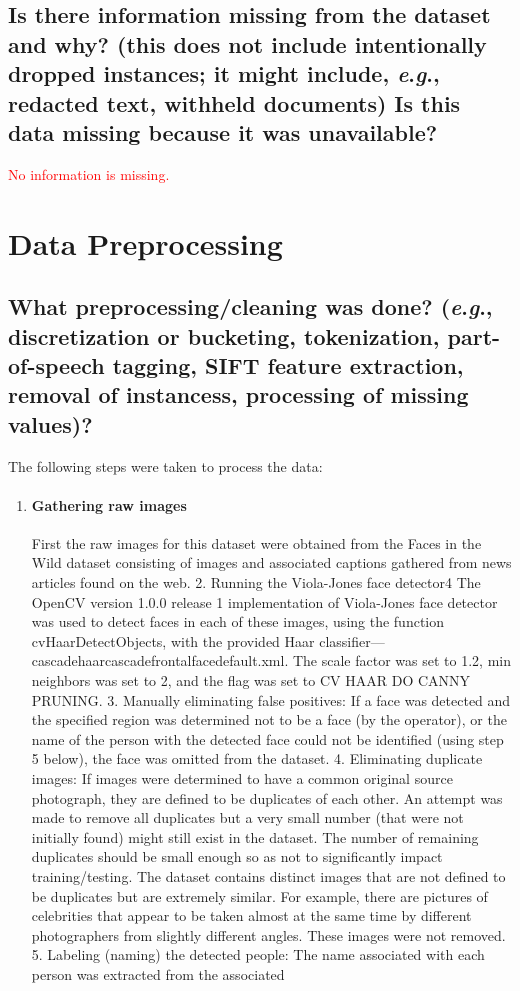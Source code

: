 \documentclass[a4paper,9pt]{extarticle}
\newcommand{\eg}{\textit{e}.\textit{g}., }
\newcounter{step}[section]
\begin{document}
\begin{multicols}{2}
\subsection*{Is there information missing from the dataset and why? (this does not include intentionally dropped instances; it might include, \eg redacted text, withheld documents) Is this data missing because it was unavailable?}
\noindent
\textcolor{red}{
No information is missing.
}

\section*{Data Preprocessing}
\subsection*{What preprocessing/cleaning was done? (\eg discretization or bucketing, tokenization, part-of-speech tagging, SIFT feature extraction, removal of instancess, processing of missing values)?}
\noindent The following steps were taken to process the data:
\begin{enumerate}

\item \paragraph{Gathering raw images} First the raw images for this
dataset were obtained from the Faces in the Wild dataset
consisting of images and associated captions gathered from
news articles found on the web.
2. Running the Viola-Jones face detector4 The OpenCV version 1.0.0 release 1 implementation of Viola-Jones face detector was used to detect faces in each of these images, using
the function cvHaarDetectObjects, with the provided Haar
classifier—cascadehaarcascadefrontalfacedefault.xml. The
scale factor was set to 1.2, min neighbors was set to 2, and
the flag was set to CV HAAR DO CANNY PRUNING.
3. Manually eliminating false positives: If a face was detected and the specified region was determined not to be a
face (by the operator), or the name of the person with the
detected face could not be identified (using step 5 below),
the face was omitted from the dataset.
4. Eliminating duplicate images: If images were determined
to have a common original source photograph, they are defined to be duplicates of each other. An attempt was made to
remove all duplicates but a very small number (that were not
initially found) might still exist in the dataset. The number
of remaining duplicates should be small enough so as not
to significantly impact training/testing. The dataset contains
distinct images that are not defined to be duplicates but are
extremely similar. For example, there are pictures of celebrities that appear to be taken almost at the same time by different photographers from slightly different angles. These
images were not removed.
5. Labeling (naming) the detected people: The name associated with each person was extracted from the associated
\end{enumerate}


\end{multicols}
\end{document}
